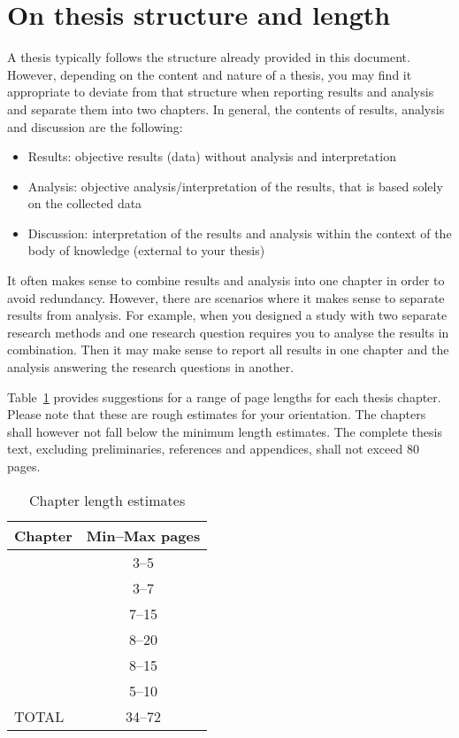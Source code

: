 
\section{On thesis structure and length}
A thesis typically follows the structure already provided in this document. However, depending on the content and nature of a thesis, you may find it appropriate to deviate from that structure when reporting results and analysis and separate them into two chapters. In general, the contents of results, analysis and discussion are the following:
\begin{itemize}
    \item Results: objective results (data) without analysis and interpretation
    \item Analysis: objective analysis/interpretation of the results, that is based solely on the collected data
    \item Discussion: interpretation of the results and analysis within the context of the body of knowledge (external to your thesis)
\end{itemize}

It often makes sense to combine results and analysis into one chapter in order to avoid redundancy. However, there are scenarios where it makes sense to separate results from analysis. For example, when you designed a study with two separate research methods and one research question requires you to analyse the results in combination. Then it may make sense to report all results in one chapter and the analysis answering the research questions in another. 

Table~\ref{tab:pl} provides suggestions for a range of page lengths for each thesis chapter. Please note that these are rough estimates for your orientation. The chapters shall however not fall below the minimum length estimates. The complete thesis text, excluding preliminaries, references and appendices, shall not exceed 80 pages. 

\begin{table}[htb]
    \centering
    \begin{tabular}{lc}
        \toprule
        Chapter & Min--Max pages  \\
        \midrule
        \nameref{chp:introduction} & 3--5 \\
        \nameref{chp:relatedwork} & 3--7 \\
        \nameref{chp:method} & 7--15 \\
        \nameref{chp:results} & 8--20 \\
        \nameref{chp:discussion} & 8--15 \\
        \nameref{chp:conclusions} & 5--10 \\
        \midrule
        TOTAL & 34--72 \\
        \bottomrule
    \end{tabular}
    \caption{Chapter length estimates}
    \label{tab:pl}
\end{table}


